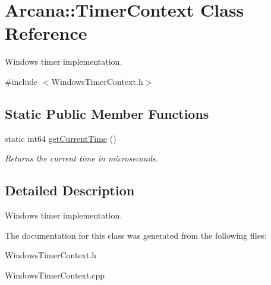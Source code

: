 \hypertarget{class_arcana_1_1_timer_context}{}\section{Arcana\+:\+:Timer\+Context Class Reference}
\label{class_arcana_1_1_timer_context}


Windows timer implementation.  




{\ttfamily \#include $<$Windows\+Timer\+Context.\+h$>$}

\subsection*{Static Public Member Functions}
\begin{DoxyCompactItemize}
\item 
\mbox{\label{class_arcana_1_1_timer_context_a8c9e8ebe4e97958c05c1842ceed706ca}} 
static int64 \mbox{\hyperlink{class_arcana_1_1_timer_context_a8c9e8ebe4e97958c05c1842ceed706ca}{get\+Current\+Time}} ()
\begin{DoxyCompactList}\small\item\em Returns the current time in microseconds. \end{DoxyCompactList}\end{DoxyCompactItemize}


\subsection{Detailed Description}
Windows timer implementation. 

The documentation for this class was generated from the following files\+:\begin{DoxyCompactItemize}
\item 
Windows\+Timer\+Context.\+h\item 
Windows\+Timer\+Context.\+cpp\end{DoxyCompactItemize}
